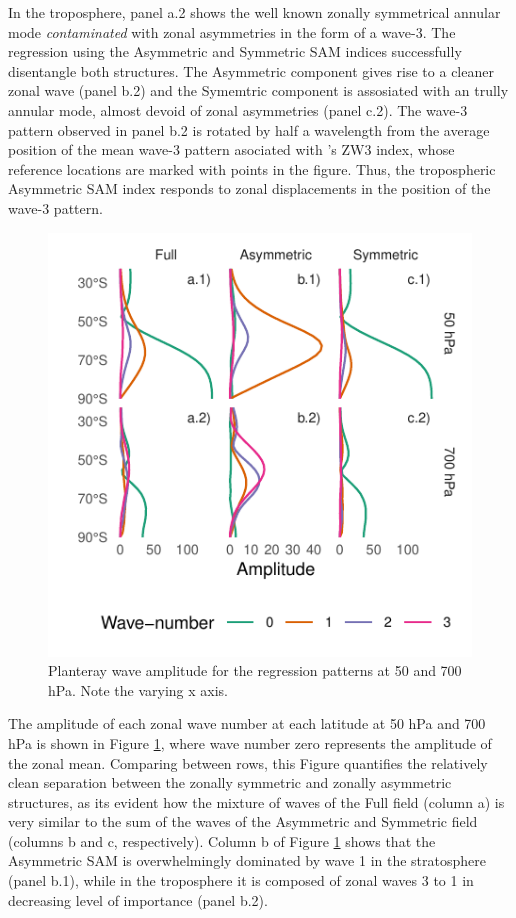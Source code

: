 \documentclass[]{ametsocV5}
\begin{document}
In the troposphere, panel a.2 shows the well known zonally symmetrical
annular mode \emph{contaminated} with zonal asymmetries in the form of a
wave-3. The regression using the Asymmetric and Symmetric SAM indices
successfully disentangle both structures. The Asymmetric component gives
rise to a cleaner zonal wave (panel b.2) and the Symemtric component is
assosiated with an trully annular mode, almost devoid of zonal
asymmetries (panel c.2). The wave-3 pattern observed in panel b.2 is
rotated by half a wavelength from the average position of the mean
wave-3 pattern asociated with \citet{raphael2004}'s ZW3 index, whose
reference locations are marked with points in the figure. Thus, the
tropospheric Asymmetric SAM index responds to zonal displacements in the
position of the wave-3 pattern.

\begin{figure}
\includegraphics{wave-amplitude-1} \caption[Planteray wave amplitude for the regression patterns at 50 and 700 hPa]{Planteray wave amplitude for the regression patterns at 50 and 700 hPa. Note the varying x axis.}\label{fig:wave-amplitude}
\end{figure}

The amplitude of each zonal wave number at each latitude at 50 hPa and
700 hPa is shown in Figure \ref{fig:wave-amplitude}, where wave number
zero represents the amplitude of the zonal mean. Comparing between rows,
this Figure quantifies the relatively clean separation between the
zonally symmetric and zonally asymmetric structures, as its evident how
the mixture of waves of the Full field (column a) is very similar to the
sum of the waves of the Asymmetric and Symmetric field (columns b and c,
respectively). Column b of Figure \ref{fig:wave-amplitude} shows that
the Asymmetric SAM is overwhelmingly dominated by wave 1 in the
stratosphere (panel b.1), while in the troposphere it is composed of
zonal waves 3 to 1 in decreasing level of importance (panel b.2).
\end{document}
